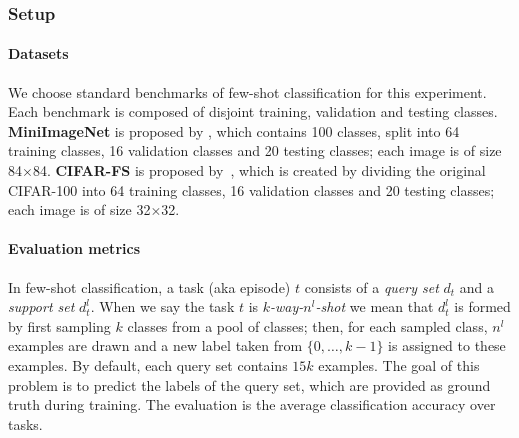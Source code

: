 \documentclass{article} \usepackage{iclr2020_conference,times}
\newcommand{\supp}{l}
\begin{document}
\subsubsection{Setup}

\paragraph{Datasets}
We choose standard benchmarks of few-shot classification for this experiment.
Each benchmark is composed of disjoint training, validation and testing classes. 
\textbf{MiniImageNet} is proposed by \citet{vinyals2016matching}, which contains 100 classes, 
split into 64 training classes, 16 validation classes and 20 testing classes;
each image is of size 84$\times$84. 
\textbf{CIFAR-FS} is proposed by~\citet{Bertinetto2018MetalearningWD}, 
which is created by dividing the original CIFAR-100 into 
64 training classes, 16 validation classes and 20 testing classes; 
each image is of size 32$\times$32.


\paragraph{Evaluation metrics} In few-shot classification, 
a task (aka episode) $t$ consists of a \emph{query set} $d_t$ and a \emph{support set} $d_t^\supp$. 
When we say the task $t$ is \emph{$k$-way-$n^\supp$-shot} we mean that 
$d_t^\supp$ is formed by first sampling $k$ classes from a pool of classes;
then, for each sampled class, $n^\supp$ examples are drawn and a new label taken from $\{0, \ldots, k-1\}$ is assigned to these examples.
By default, each query set contains $15k$ examples.
The goal of this problem is to predict the labels of the query set, which are provided as ground truth during training.
The evaluation is the average classification accuracy over tasks.
\end{document}
